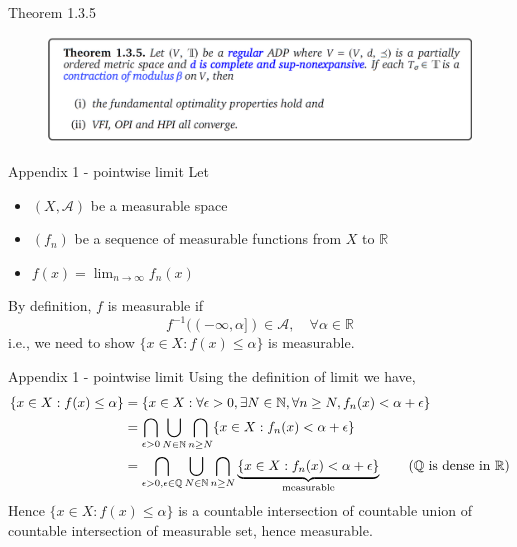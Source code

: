 \documentclass[aspectratio=169]{beamer} %
\begin{document}
\begin{frame}{Theorem 1.3.5}
    \begin{figure}
        \centering
        \includegraphics[width=1\linewidth]{Dynamic Programming/DP2/Chapter 4/4.2.4.1 Job Search with Separation/thm135.png}
    \end{figure}
\end{frame}
\begin{frame}{Appendix 1 - pointwise limit}\label{app:pointwise}
    Let 
    \begin{itemize}
        \item $(X,\mathcal{A})$ be a measurable space
        \item $(f_n)$ be a sequence of measurable functions from $X$ to $\mathbb{R}$
        \item $f(x) = \lim_{n\to\infty} f_n(x)$
    \end{itemize}
    By definition, $f$ is measurable if
    $$
    f^{-1}((-\infty, \alpha])\in\mathcal{A},\quad \forall \alpha\in\mathbb{R}
    $$
    i.e., we need to show $\{x\in X: f(x)\le \alpha\}$ is measurable. 
\end{frame}

\begin{frame}{Appendix 1 - pointwise limit}
Using the definition of limit we have,
\begin{align*}
    \{x\in X: f(x)\le \alpha\} &= \{x\in X: \forall\epsilon>0,\exists N\in\mathbb{N}, \forall n\ge N, f_n(x)<\alpha+\epsilon\}\\
    &= \bigcap_{\epsilon>0}\bigcup_{N\in\mathbb{N}}\bigcap_{n\ge N} \{x\in X: f_n(x)<\alpha+\epsilon\}\\
    &= \bigcap_{\epsilon>0,\epsilon\in \mathbb{Q}}\bigcup_{N\in\mathbb{N}}\bigcap_{n\ge N}\underbrace{\{x\in X: f_n(x)<\alpha+\epsilon\}}_{\text{measurable}}\tag{$\mathbb{Q}$ is dense in $\mathbb{R}$}\\
\end{align*}
Hence $\{x\in X: f(x)\le \alpha\}$ is a countable intersection of countable union of countable intersection of measurable set, hence measurable.
    
\end{frame}
\end{document}
